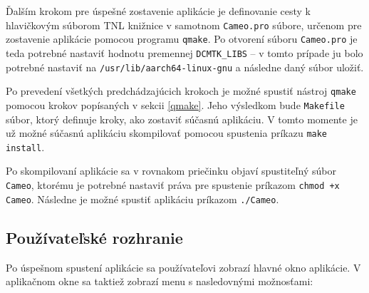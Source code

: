 {Ďalším krokom pre úspešné zostavenie aplikácie je definovanie cesty k hlavičkovým súborom TNL knižnice v samotnom \texttt{Cameo.pro} súbore, určenom pre zostavenie aplikácie pomocou programu \texttt{qmake}. Po otvorení súboru \texttt{Cameo.pro} je teda potrebné nastaviť hodnotu premennej \lstinline{DCMTK_LIBS} -- v tomto prípade ju bolo potrebné nastaviť na \texttt{/usr/lib/aarch64-linux-gnu} a následne daný súbor uložiť.

Po prevedení všetkých predchádzajúcich krokoch je možné spustiť nástroj \texttt{qmake} pomocou krokov popísaných v sekcii \ref{qmake}. Jeho výsledkom bude \texttt{Makefile} súbor, ktorý definuje kroky, ako zostaviť súčasnú aplikáciu. V tomto momente je už možné súčasnú aplikáciu skompilovať pomocou spustenia príkazu \texttt{make install}.

Po skompilovaní aplikácie sa v rovnakom priečinku objaví spustiteľný súbor \texttt{Cameo}, ktorému je potrebné nastaviť práva pre spustenie príkazom \texttt{chmod +x Cameo}. Následne je možné spustiť aplikáciu príkazom \texttt{./Cameo}.

\subsection {Používateľské rozhranie}

Po úspešnom spustení aplikácie sa používateľovi zobrazí hlavné okno aplikácie.
V aplikačnom okne sa taktiež zobrazí menu s nasledovnými možnosťami:

}
